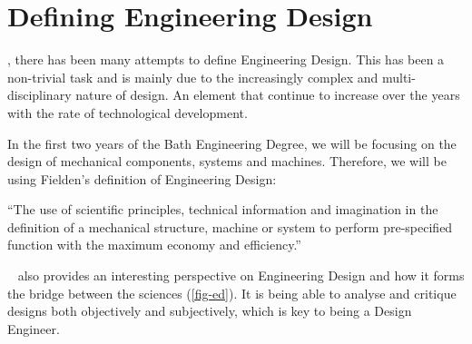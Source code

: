 \section{Defining Engineering Design}

, there has been many attempts to define Engineering Design. 
This has been a non-trivial task and is mainly due to the increasingly complex and multi-disciplinary nature of design. 
An element that continue to increase over the years with the rate of technological development.

In the first two years of the Bath Engineering Degree, we will be focusing on the design of mechanical components, systems and machines. 
Therefore, we will be using Fielden's definition of Engineering Design:

\begin{center}
  ``The use of scientific principles, technical information and imagination in the definition of a mechanical structure, machine or system to perform pre-specified function with the maximum economy and efficiency.''~\cite{fielden1963}
\end{center}

\citeauthor{pahl2013}~\cite{pahl2013} also provides an interesting perspective on Engineering Design and how it forms the bridge between the sciences (\cref{fig-ed}). It is being able to analyse and critique designs both objectively and subjectively, which is key to being a Design Engineer.

\begin{figure*}
    \centering
    
    \caption[Positioning Engineering Design within the sciences]{Positioning Engineering Design within the sciences~\citep{pahl2013}}\label{fig-ed}
\end{figure*}
